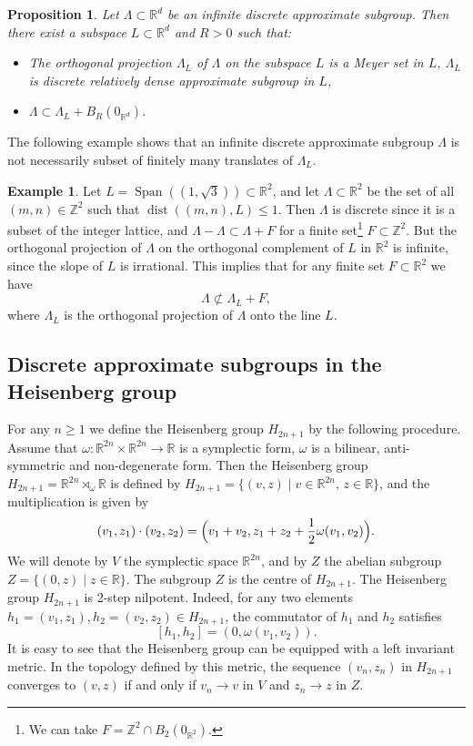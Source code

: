 \documentclass[10pt]{amsart}
\DeclareMathOperator{\dist}{dist}
\DeclareMathOperator{\Span}{Span}
\newcommand{\bR}{\mathbb{R}}
\newcommand{\bZ}{\mathbb{Z}}
\newcounter{dummy} \numberwithin{dummy}{section}
\theoremstyle{plain}
\newtheorem{prop}[dummy]{Proposition}
\theoremstyle{definition}
\newtheorem{example}[dummy]{Example}
\begin{document}
\begin{prop}\label{meyer}
Let $\Lambda \subset \bR^d$ be an infinite discrete approximate subgroup. Then there exist a subspace $L \subset \bR^d$ and $R > 0$ such that:
\begin{itemize}
\item The orthogonal projection $\Lambda_L$ of $\Lambda$ on the subspace $L$ is a Meyer set in $L$, \ie $\Lambda_L$ is discrete relatively dense approximate subgroup in $L$,
\item $\Lambda \subset \Lambda_L + B_R(0_{\bR^d})$.
\end{itemize}
\end{prop}

The following example shows that an infinite discrete approximate subgroup $\Lambda$ is not necessarily subset of finitely many translates of $\Lambda_L$.

\begin{example}
Let $L = \Span((1,\sqrt{3})) \subset \bR^2$, and let $\Lambda \subset \bR^2$ be the set of all $(m,n) \in \bZ^2$ such that $\dist((m,n),L) \le 1$. Then $\Lambda$ is discrete since it is a subset of the integer lattice, and $\Lambda - \Lambda \subset \Lambda + F$ for a finite set\footnote{We can take $F = \bZ^2 \cap B_{2}(0_{\bR^2})$.} $F \subset \bZ^2$. But the orthogonal projection of $\Lambda$ on the orthogonal complement of $L$ in $\bR^2$ is infinite, since the slope of $L$ is irrational. This implies that for any finite set $F \subset \bR^2$ we have
\[
\Lambda \not \subset \Lambda_L + F,
\]
where $\Lambda_L$ is the orthogonal projection of $\Lambda$ onto the line $L$.
\end{example}

\subsection{Discrete approximate subgroups in the Heisenberg group} For any $n \ge 1$ we define the Heisenberg group $H_{2n+1}$ by the following procedure. Assume that \hbox{$\omega:\bR^{2n} \times \bR^{2n} \to \bR$} is a symplectic form, \ie $\omega$ is a bilinear, anti-symmetric and non-degenerate form. Then the Heisenberg group $H_{2n+1} = \bR^{2n} \rtimes_{\omega} \bR$ is defined by $H_{2n+1} = \{ (v,z) \mid v \in \bR^{2n},\, z \in \bR\}$, and the multiplication is given by
\[
(v_1,z_1) \cdot (v_2,z_2) = \Bigl(v_1+v_2, z_1 + z_2 + \frac{1}{2}\omega(v_1,v_2)\Bigr).
\]
We will denote by $V$ the symplectic space $\bR^{2n}$, and by $Z$ the abelian subgroup \hbox{$Z = \{ (0,z) \mid z \in \bR\}$}. The subgroup $Z$ is the centre of $H_{2n+1}$. The Heisenberg group $H_{2n+1}$ is 2-step nilpotent. Indeed, for any two elements $h_1= (v_1,z_1), h_2 = (v_2,z_2) \in H_{2n+1}$, the commutator of $h_1$ and $h_2$ satisfies
\begin{equation}
\label{import_id}
[h_1,h_2] = (0, \omega(v_1,v_2)).
\end{equation}
It is easy to see that the Heisenberg group can be equipped with a left invariant metric. In the topology defined by this metric, the sequence $(v_n,z_n)$ in $H_{2n+1}$ converges to $(v,z)$ if and only if $v_n \to v$ in $V$ and $z_n \to z$ in $Z$.
\end{document}
